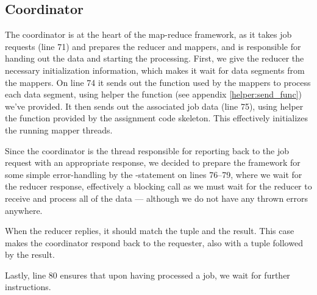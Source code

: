 \subsection{Coordinator}
\label{coordinator}
The coordinator is at the heart of the map-reduce framework, as it takes job
requests (line 71) and prepares the reducer and mappers, and is responsible
for handing out the data and starting the processing. First, we give the
reducer the necessary initialization information, which makes it wait for data
segments from the mappers. On line 74 it sends out the function used by the
mappers to process each data segment, using helper the function
 (see appendix \ref{helper:send_func}) we've provided. It
then sends out the associated job data (line 75), using helper the function
 provided by the assignment code skeleton. This effectively
initializes the running mapper threads.

Since the coordinator is the thread responsible for reporting back to the job
request with an appropriate response, we decided to prepare the framework for
some simple error-handling by the -statement on lines 76--79,
where we wait for the reducer response, effectively a blocking call as we must
wait for the reducer to receive and process all of the data --- although we do
not have any thrown errors anywhere.


When the reducer replies, it should match the tuple  and the result.
This case makes the coordinator respond back to the requester, also with a
tuple  followed by the result.

Lastly, line 80 ensures that upon having processed a job, we wait for further
instructions.
